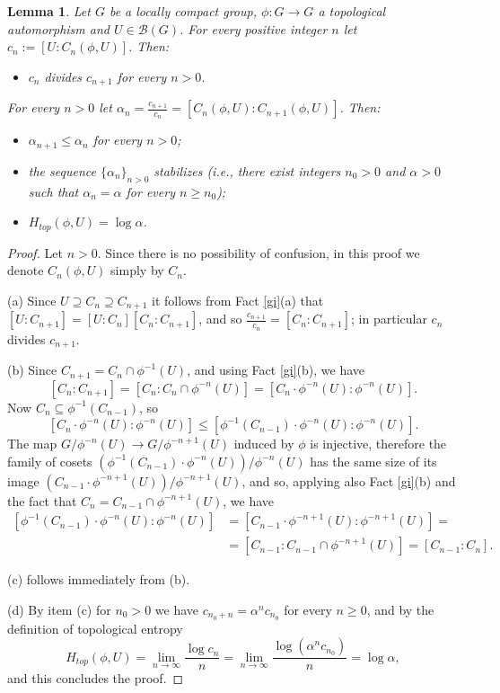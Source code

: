\documentclass[11pt]{article}
\newtheorem{lemma}[theorem]{Lemma}
\theoremstyle{definition}
\numberwithin{equation}{section}
\begin{document}
\begin{lemma}\label{logalpha}
Let $G$ be a locally compact group, $\phi:G\to G$ a topological automorphism and $U\in\mathcal B(G)$. For every positive integer $n$ let $c_n:=[U:C_n(\phi,U)]$. Then:
\begin{itemize}
\item[(a)] $c_{n}$ divides $c_{n+1}$ for every $n>0$. 
\end{itemize}
For every $n>0$ let $\alpha_{n}=\frac{c_{n+1}}{c_{n}}=[C_{n}(\phi,U):C_{n+1}(\phi,U)]$. Then:
\begin{itemize}
\item[(b)] $\alpha_{n+1}\leq\alpha_{n}$ for every $n>0$;
\item[(c)] the sequence $\{\alpha_n\}_{n>0}$ stabilizes (i.e., there exist integers $n_0>0$ and $\alpha>0$ such that $\alpha_n=\alpha$ for every $n\geq n_0$);
\item[(d)] $H_{top}(\phi,U)=\log\alpha$.
\end{itemize}
\end{lemma}
\begin{proof}
Let $n>0$. Since there is no possibility of confusion, in this proof we denote $C_n(\phi,U)$ simply by $C_n$.

\smallskip
(a) Since $U\supseteq C_n\supseteq C_{n+1}$ it follows from Fact \ref{gi}(a) that $[U:C_{n+1}]=[U:C_n][C_n:C_{n+1}]$, and so $\frac{c_{n+1}}{c_n}=[C_{n}:C_{n+1}]$; in particular $c_{n}$ divides $c_{n+1}$.

\smallskip
(b) Since $C_{n+1}=C_n\cap \phi^{-1}(U)$, and using Fact \ref{gi}(b), we have $$[C_n:C_{n+1}]=[C_n:C_n\cap \phi^{-n}(U)]=[C_n\cdot\phi^{-n}(U):\phi^{-n}(U)].$$ Now $C_n\subseteq \phi^{-1}(C_{n-1})$, so $$[C_n\cdot\phi^{-n}(U):\phi^{-n}(U)]\leq[\phi^{-1}(C_{n-1})\cdot\phi^{-n}(U):\phi^{-n}(U)].$$
The map $G/\phi^{-n}(U)\to G/\phi^{-n+1}(U)$ induced by $\phi$ is injective, therefore the family of cosets
$(\phi^{-1}(C_{n-1})\cdot\phi^{-n}(U))/\phi^{-n}(U)$ has the same size of its image $(C_{n-1}\cdot\phi^{-n+1}(U))/\phi^{-n+1}(U)$, and so, applying also Fact \ref{gi}(b) and the fact that $C_n=C_{n-1}\cap \phi^{-n+1}(U)$, we have
\begin{equation*}\begin{split}
[\phi^{-1}(C_{n-1})\cdot\phi^{-n}(U):\phi^{-n}(U)]&=[C_{n-1}\cdot\phi^{-n+1}(U):\phi^{-n+1}(U)]=\\&=[C_{n-1}:C_{n-1}\cap \phi^{-n+1}(U)]=[C_{n-1}:{C_n}].
\end{split}\end{equation*}

\smallskip
(c) follows immediately from (b).

\smallskip
(d) By item (c) for $n_0>0$ we have $c_{n_0+n}=\alpha^n c_{n_0}$ for every $n\geq0$, and by the definition of topological entropy 
$$H_{top}(\phi,U)=\lim_{n\to\infty}\frac{\log c_n}{n}=\lim_{n\to \infty}\frac{\log(\alpha^n c_{n_0})}{n}=\log\alpha,$$
and this concludes the proof.
\end{proof}
\end{document}
